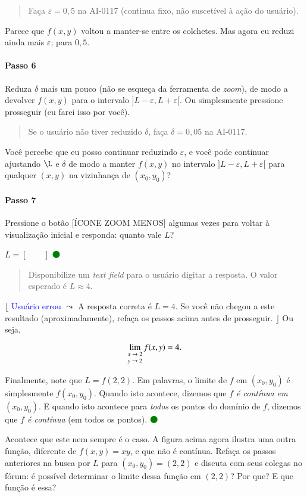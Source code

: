 \documentclass[fleqn,12pt]{article}
\newenvironment{ct}{\begin{quotation}\color{red!30!black}\sffamily\small}{\end{quotation}} %
\newcommand\foreign[1]{\textsl{#1}}
\newcommand\proceed{\textcolor{green}{$\medbullet$}\xspace}
\newcommand\pt{\ensuremath{(x,y)}\xspace}
\newcommand\condicional[2]{$\lfloor$%
	\textsf{\textcolor{blue}{{\footnotesize #1}}}
	$\leadsto$ #2%
	$\rfloor$}
\newcommand\ptzero{\ensuremath{(x_0,y_0)}\xspace}
\begin{document}
    \begin{ct}
	Faça $\varepsilon = 0,5$ na AI-0117 (continua fixo, não suscetível à ação do usuário).
    \end{ct}

    Parece que $f(x,y)$ voltou a manter-se entre os colchetes. Mas agora eu reduzi ainda mais $\varepsilon$; para $0,5$.

    \paragraph{Passo 6} Reduza $\delta$ mais um pouco (não se esqueça da ferramenta de \foreign{zoom}), de modo a devolver $f(x,y)$ para o intervalo $]L - \varepsilon, L + \varepsilon[$. Ou simplesmente pressione prosseguir (eu farei isso por você).

    \begin{ct}
	Se o usuário não tiver reduzido $\delta$, faça $\delta = 0,05$ na AI-0117.
    \end{ct}

    Você percebe que eu posso continuar reduzindo $\varepsilon$, e você pode continuar ajustando $\L$ e $\delta$ de modo a manter $f(x,y)$ no intervalo $]L - \varepsilon, L + \varepsilon[$ para qualquer \pt na vizinhança de \ptzero?

    \paragraph{Passo 7} Pressione o botão [ÍCONE ZOOM MENOS] algumas vezes para voltar à visualização inicial e responda: quanto vale $L$?

    $L = [\qquad]$ \proceed

    \begin{ct}
	Disponibilize um \foreign{text field} para o usuário digitar a resposta. O valor esperado é $L \approx 4$.
    \end{ct}

    \condicional{Usuário errou}{A resposta correta é $L = 4$. Se você não chegou a este resultado (aproximadamente), refaça os passos acima antes de prosseguir.} Ou seja,

    \begin{equation*}
	\lim_{\scriptsize
	    \begin{matrix}
		x  \to 2 \\
		y  \to 2
	    \end{matrix}}
	f(x,y) = 4.
    \end{equation*}

    Finalmente, note que $L = f(2,2)$. Em palavras, o limite de $f$ em \ptzero é simplesmente $f(x_0,y_0)$. Quando isto acontece, dizemos que \emph{$f$ é contínua em \ptzero}. E quando isto acontece para \emph{todos} os pontos do domínio de $f$, dizemos que \emph{$f$ é contínua} (em todos os pontos). \proceed

    Acontece que este nem sempre é o caso. A figura acima agora ilustra uma outra função, diferente de $f(x,y) = xy$, e que não é contínua. Refaça os passos anteriores na busca por $L$ para $(x_0,y_0) = (2,2)$ e discuta com seus colegas no fórum: é possível determinar o limite dessa função em $(2,2)$? Por que? E que função é essa?
\end{document}

